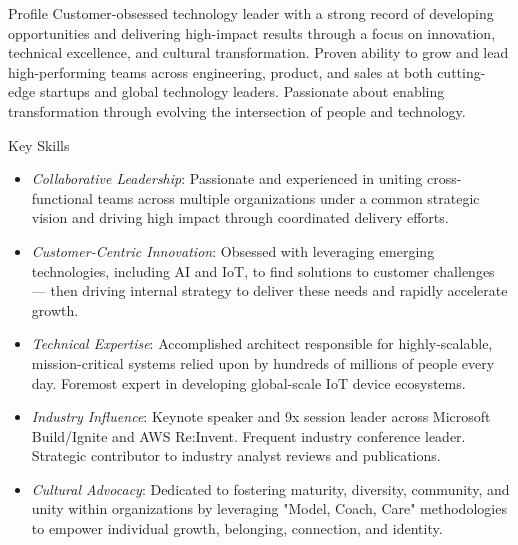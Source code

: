 \documentclass{resume} %
\begin{document}
\vspace{-1em}
\begin{rSection}{Profile}
  Customer-obsessed technology leader with a strong record of developing opportunities and delivering high-impact results through a focus on innovation, technical excellence, and cultural transformation. Proven ability to grow and lead high-performing teams across engineering, product, and sales at both cutting-edge startups and global technology leaders. Passionate about enabling transformation through evolving the intersection of people and technology.

\end{rSection}

\begin{rSection}{Key Skills}
  \begin{itemize}
    \setlength\itemsep{-0.5em}
    \item \textit{Collaborative Leadership}: Passionate and experienced in uniting cross-functional teams across multiple organizations under a common strategic vision and driving high impact through coordinated delivery efforts.
    \item \textit{Customer-Centric Innovation}: Obsessed with leveraging emerging technologies, including AI and IoT, to find solutions to customer challenges --- then driving internal strategy to deliver these needs and rapidly accelerate growth.
    \item \textit{Technical Expertise}: Accomplished architect responsible for highly-scalable, mission-critical systems relied upon by hundreds of millions of people every day. Foremost expert in developing global-scale IoT device ecosystems.
    \item \textit{Industry Influence}: Keynote speaker and 9x session leader across Microsoft Build/Ignite and AWS Re:Invent. Frequent industry conference leader. Strategic contributor to industry analyst reviews and publications.
    \item \textit{Cultural Advocacy}: Dedicated to fostering maturity, diversity, community, and unity within organizations by leveraging "Model, Coach, Care" methodologies to empower individual growth, belonging, connection, and identity.
  \end{itemize}
  
\end{rSection}
\end{document}
